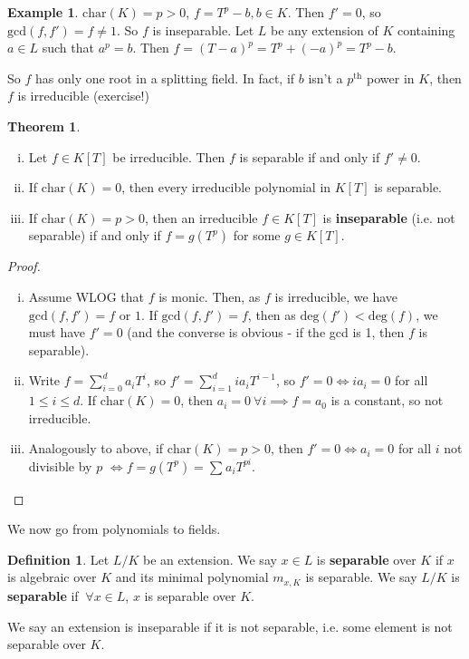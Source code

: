 \documentclass{article}
\theoremstyle{definition}
\newtheorem{theorem}{Theorem}[section]
\newtheorem{example}{Example}[section]
\newtheorem{defn}{Definition}[section]
\begin{document}
\begin{example}
    $\text{char}(K)=p>0$, $f = T^p - b, b \in K$. Then $f'=0$, so $\text{gcd}(f,f')=f \neq 1$. So $f$ is inseparable. Let $L$ be any extension of $K$ containing $a \in L$ such that $a^p = b$. Then $f=(T-a)^p = T^p + (-a)^p = T^p - b$. 

    So $f$ has only one root in a splitting field. In fact, if $b$ isn't a $p^{\text{th}}$ power in $K$, then $f$ is irreducible (exercise!)
\end{example}
\begin{theorem}
    \begin{enumerate}[(i)]
        \item Let $f \in K[T]$ be irreducible. Then $f$ is separable if and only if $f' \neq 0$. 
        \item If $\text{char}(K)=0$, then every irreducible polynomial in $K[T]$ is separable.
        \item If $\text{char}(K)=p>0$, then an irreducible $f \in K[T]$ is \textbf{inseparable} (i.e. not separable) if and only if $f=g(T^p)$ for some $g \in K[T]$.
    \end{enumerate}
\end{theorem}
\begin{proof}
    \begin{enumerate}[(i)]
        \item Assume WLOG that $f$ is monic. Then, as $f$ is irreducible, we have $\text{gcd}(f,f') = f$ or $1$. If $\text{gcd}(f,f')=f$, then as $\text{deg}(f')<\text{deg}(f)$, we must have $f'=0$ (and the converse is obvious - if the gcd is 1, then $f$ is separable).
        \item Write $f = \sum_{i=0}^{d} a_iT^i$, so $f' = \sum_{i=1}^{d} ia_iT^{i-1}$, so $f'=0 \iff ia_i = 0$ for all $1\le i\le d$. If $\text{char}(K)=0$, then $a_i=0 ~\forall i \implies f = a_0$ is a constant, so not irreducible.
        \item Analogously to above, if $\text{char}(K)=p>0$, then $f'=0 \iff a_i=0$ for all $i$ not divisible by $p$ $\iff f=g(T^p) = \sum_{}^{} a_{i}T^{pi}$. 
    \end{enumerate}
\end{proof}
We now go from polynomials to fields.
\begin{defn}
    Let $L/K$ be an extension. We say $x \in L$ is \textbf{separable} over $K$ if $x$ is algebraic over $K$ and its minimal polynomial $m_{x,K}$ is separable. We say $L/K$ is \textbf{separable} if $~\forall x \in L$, $x$ is separable over $K$. 
    
    We say an extension is inseparable if it is not separable, i.e. some element is not separable over $K$.
\end{defn}
\end{document}

